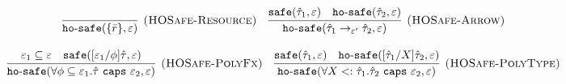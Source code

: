 \documentclass{llncs}
\newcommand{\keywadj}[1]{\mathtt{#1}}
\newcommand{\keyw}[1]{\keywadj{#1}~}
\newcommand{\kw}[1]{\keyw{ #1 }}
\newcommand{\kwa}[1]{\keywadj{ #1 }}
\newcommand{\hyphen}{\hbox{-}}
\newcommand{\safe}[2]{ \kwa{safe}(#1, #2) }
\newcommand{\hosafe}[2]{ \kwa{ho \hyphen safe}(#1, #2) }
\newcommand{\polycap}[3]{
	\forall #1. #2~ \kw{caps} #3
}
\newcommand{\ispoly}[1]{
	\kwa{is \hyphen poly}(#1)
}
\begin{document}
\[
\begin{array}{c}

\infer[\textsc{(HOSafe-Resource)}]
	{ \kwa{ho \hyphen safe}( \{ \bar r \}, \varepsilon)} 
	{}
	~~~
\infer[\textsc{(HOSafe-Arrow)}]
	{ \kwa{ho \hyphen safe}( \hat \tau_1 \rightarrow_{\varepsilon'} \hat \tau_2, \varepsilon ) }
	{ \kwa{safe}(\hat \tau_1, \varepsilon)  & \kwa{ho \hyphen safe}(\hat \tau_2, \varepsilon) }\\[3ex]

\infer[\textsc{(HOSafe-PolyFx)}]
	{\hosafe{\polycap{\phi \subseteq \varepsilon_1}{\hat \tau}{\varepsilon_2}}{\varepsilon}}
	{\varepsilon_1 \subseteq \varepsilon & \safe{[\varepsilon_1/\phi]\hat \tau}{\varepsilon} } ~~~

\infer[\textsc{(HOSafe-PolyType)}]
	{\hosafe{\polycap{X <: \hat \tau_1}{\hat \tau_2}{\varepsilon_2}}{\varepsilon}}
	{ \safe{\hat \tau_1}{\varepsilon} & \hosafe{[\hat \tau_1/X]\hat \tau_2}{\varepsilon} }

\end{array}
\]









\fbox{$\hat \Gamma \vdash \hat \tau <: \hat \tau$}
\end{document}
